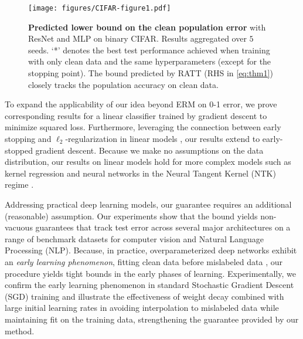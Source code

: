 \begin{figure}[t!]
        \centering 
        \texttt{[image: figures/CIFAR-figure1.pdf]}
        \vspace{-8pt}
        \caption{ \textbf{Predicted lower bound on the clean population error} 
        with ResNet and MLP on binary CIFAR. 
        Results aggregated over $5$ seeds. 
        `*' denotes the best test performance 
        achieved when training with only clean data
        and the same hyperparameters 
        (except for the stopping point).
        The bound predicted by RATT (RHS in \eqref{eq:thm1}) closely tracks 
        the population accuracy on clean data. 
        }\label{fig:error_CIFAR10}
        \vspace{-5pt}
\end{figure}
    

    
To expand the applicability of our idea
beyond ERM on 0-1 error,
we prove corresponding results 
for a linear classifier 
trained by gradient descent
to minimize squared loss. 
Furthermore, leveraging the connection 
between early stopping 
and $\ell_2$-regularization 
in linear models 
\citep{ali2018continuous,ali2020implicit,suggala2018connecting}, 
our results extend to early-stopped gradient descent.  
Because we make no assumptions
on the data distribution, 
our results on linear models
hold for more complex models 
such as kernel regression 
and neural networks in the Neural Tangent Kernel (NTK) regime
\citep{jacot2018neural, du2018gradient, du2019gradient, allen2019convergence, chizat2019lazy}.


Addressing practical deep learning models,
our guarantee requires an additional (reasonable) assumption.
Our experiments show that the bound 
yields non-vacuous guarantees
that track test error
across several major architectures 
on a range of benchmark datasets
for computer vision and Natural Language Processing (NLP).
Because, in practice,
overparameterized deep networks
exhibit an \emph{early learning phenomenon},
fitting clean data 
before mislabeled data
\citep{liu2020early,arora2019fine,li2019gradient}, 
our procedure yields tight bounds 
in the early phases of learning. 
Experimentally, we confirm 
the early learning phenomenon 
in standard Stochastic Gradient Descent (SGD) training 
and illustrate the effectiveness of weight decay 
combined with large initial learning rates 
in avoiding interpolation to mislabeled data 
while maintaining fit on the training data, 
strengthening the guarantee provided by our method.


